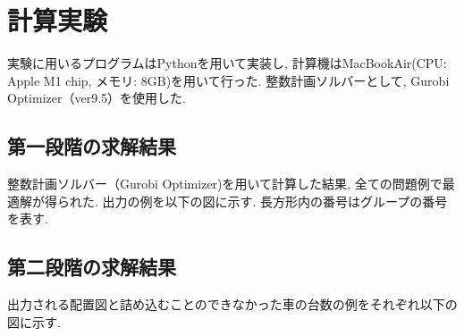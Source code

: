 \chapter{計算実験}\label{computational_result}
実験に用いるプログラムはPythonを用いて実装し, 計算機はMacBookAir(CPU: Apple M1 chip, メモリ: 8GB)を用いて行った. 
整数計画ソルバーとして, Gurobi Optimizer（ver9.5）を使用した. 

\section{第一段階の求解結果}
整数計画ソルバー（Gurobi Optimizer)を用いて計算した結果, 全ての問題例で最適解が得られた. 
出力の例を以下の図に示す. 
長方形内の番号はグループの番号を表す. 

\section{第二段階の求解結果}
出力される配置図と詰め込むことのできなかった車の台数の例をそれぞれ以下の図に示す. 

